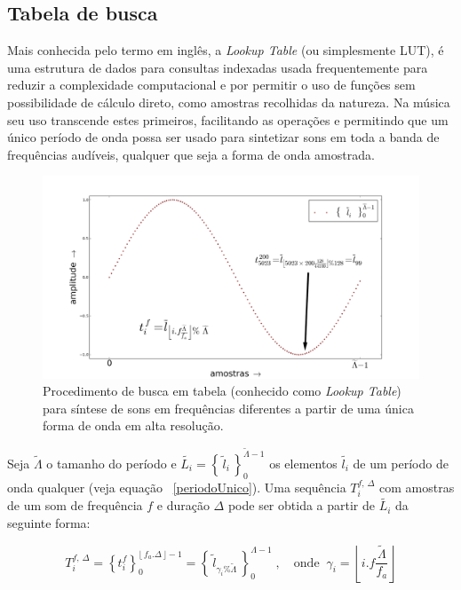\subsection{Tabela de busca}\label{subsec:lookup}

Mais conhecida pelo termo em inglês, a \emph{Lookup Table} (ou simplesmente
LUT), é uma estrutura de dados para
consultas indexadas usada
frequentemente para reduzir a complexidade computacional
e por
permitir o uso de funções sem possibilidade de cálculo direto, como
amostras recolhidas da natureza. 
Na música seu uso transcende estes
primeiros, facilitando as operações e permitindo que um único
período de onda possa ser usado para sintetizar sons em toda a banda
de frequências audíveis, qualquer que seja a forma de onda amostrada.


\begin{figure}[h!]
    \centering
        \includegraphics[width=\textwidth]{figuras/lut}
    \caption{Procedimento de busca em tabela (conhecido como \emph{Lookup Table}) para síntese de sons em frequências diferentes a partir de uma única forma de onda em alta resolução.}
        \label{fig:lut}
\end{figure}

Seja $\widetilde{\Lambda}$ o tamanho 
do período e $\widetilde{L_i} = \left\{\, \widetilde{l}_i \,\right\}_0^{\widetilde{\Lambda} -1}$ os elementos $\widetilde{l_i}$ de um
período de onda qualquer (veja equação ~\ref{periodoUnico}). Uma sequência
$T_i^{f,\,\Delta}$ com amostras de um som de frequência $f$ e duração $\Delta$
pode ser obtida a partir de $\widetilde{L_i}$ da seguinte forma:

\begin{equation}\label{eq:lut}
T_i^{f,\,\Delta}=\left\{t_i^f\right\}_0^{\lfloor \, f_a . \Delta \, \rfloor -1} = \left\{ \, \widetilde{l}_{\gamma_i \% \widetilde{\Lambda} }\, \right\}_{0}^{\Lambda-1}\; , \quad \text{onde} \;\; \gamma_i = \left \lfloor i . f \frac{ \widetilde{\Lambda}}{f_a} \right \rfloor  
\end{equation}

